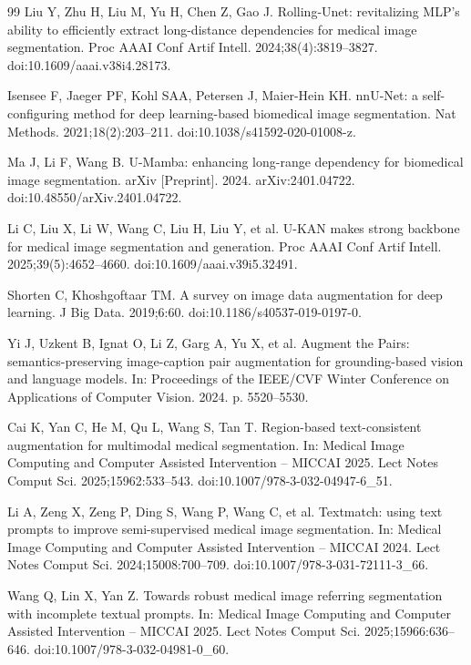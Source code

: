 \begin{thebibliography}{99}
Liu Y, Zhu H, Liu M, Yu H, Chen Z, Gao J. Rolling-Unet: revitalizing MLP's ability to efficiently extract long-distance dependencies for medical image segmentation. Proc AAAI Conf Artif Intell. 2024;38(4):3819--3827. doi:10.1609/aaai.v38i4.28173.

Isensee F, Jaeger PF, Kohl SAA, Petersen J, Maier-Hein KH. nnU-Net: a self-configuring method for deep learning-based biomedical image segmentation. Nat Methods. 2021;18(2):203--211. doi:10.1038/s41592-020-01008-z.

Ma J, Li F, Wang B. U-Mamba: enhancing long-range dependency for biomedical image segmentation. arXiv [Preprint]. 2024. arXiv:2401.04722. doi:10.48550/arXiv.2401.04722.

Li C, Liu X, Li W, Wang C, Liu H, Liu Y, et al. U-KAN makes strong backbone for medical image segmentation and generation. Proc AAAI Conf Artif Intell. 2025;39(5):4652--4660. doi:10.1609/aaai.v39i5.32491.

Shorten C, Khoshgoftaar TM. A survey on image data augmentation for deep learning. J Big Data. 2019;6:60. doi:10.1186/s40537-019-0197-0.

Yi J, Uzkent B, Ignat O, Li Z, Garg A, Yu X, et al. Augment the Pairs: semantics-preserving image-caption pair augmentation for grounding-based vision and language models. In: Proceedings of the IEEE/CVF Winter Conference on Applications of Computer Vision. 2024. p. 5520--5530.

Cai K, Yan C, He M, Qu L, Wang S, Tan T. Region-based text-consistent augmentation for multimodal medical segmentation. In: Medical Image Computing and Computer Assisted Intervention -- MICCAI 2025. Lect Notes Comput Sci. 2025;15962:533--543. doi:10.1007/978-3-032-04947-6\_51.

Li A, Zeng X, Zeng P, Ding S, Wang P, Wang C, et al. Textmatch: using text prompts to improve semi-supervised medical image segmentation. In: Medical Image Computing and Computer Assisted Intervention -- MICCAI 2024. Lect Notes Comput Sci. 2024;15008:700--709. doi:10.1007/978-3-031-72111-3\_66.

Wang Q, Lin X, Yan Z. Towards robust medical image referring segmentation with incomplete textual prompts. In: Medical Image Computing and Computer Assisted Intervention -- MICCAI 2025. Lect Notes Comput Sci. 2025;15966:636--646. doi:10.1007/978-3-032-04981-0\_60.


\end{thebibliography}
